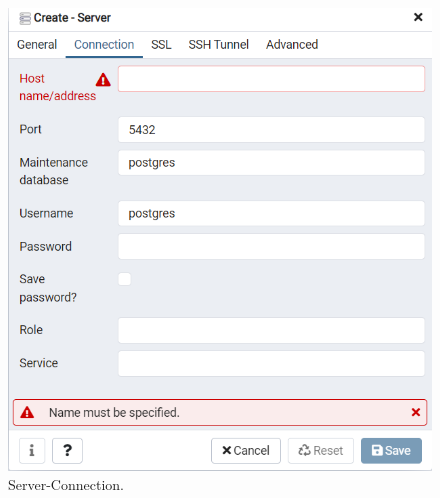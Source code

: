 			 \begin{figure}[H]
			 	\includegraphics[scale=1]{slike/server connection.png} 
			 	\centering
			 	\caption{ Server-Connection.}
			 	\label{DS}
			 \end{figure}
			 
